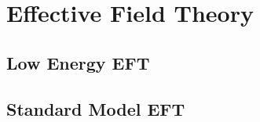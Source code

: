 \chapter{Effective Field Theory}
\label{chap:EFT}

\section{Low Energy EFT}
\label{sec:LEFT}

\section{Standard Model EFT}
\label{sec:SMEFT}